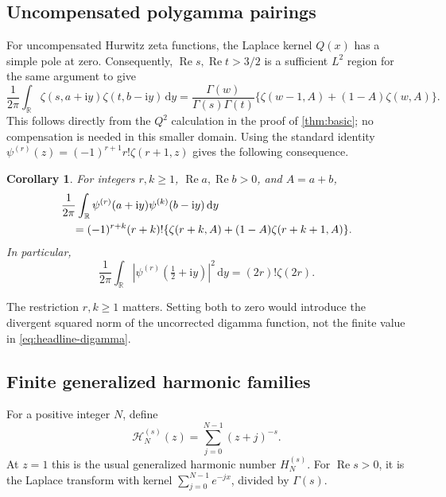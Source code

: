 \documentclass[11pt,a4paper]{article}
\newtheorem{corollary}[theorem]{Corollary}
\theoremstyle{definition}
\numberwithin{equation}{section}
\newcommand{\R}{\mathbb R}
\newcommand{\Rea}{\operatorname{Re}}
\newcommand{\dd}{\,\mathrm d}
\newcommand{\ii}{\mathrm i}
\begin{document}
\subsection{Uncompensated polygamma pairings}
For uncompensated Hurwitz zeta functions, the Laplace kernel $Q(x)$ has a
simple pole at zero. Consequently, $\Rea s,\Rea t>3/2$ is a sufficient
$L^2$ region for the same argument to give
\begin{equation}\label{eq:plain-zeta-pair}
 \frac1{2\pi}\int_{\R}\zeta(s,a+\ii y)\zeta(t,b-\ii y)\dd y
 =\frac{\Gamma(w)}{\Gamma(s)\Gamma(t)}
       \{\zeta(w-1,A)+(1-A)\zeta(w,A)\}.
\end{equation}
This follows directly from the $Q^2$ calculation in the proof of
\cref{thm:basic}; no compensation is needed in this smaller domain.
Using the standard identity
$\psi^{(r)}(z)=(-1)^{r+1}r!\zeta(r+1,z)$ gives the following consequence.

\begin{corollary}\label{thm:polygamma}
For integers $r,k\ge1$, $\Rea a,\Rea b>0$, and $A=a+b$,
\begin{align}
 &\frac1{2\pi}\int_{\R}\psi^{(r)}(a+\ii y)
                                  \psi^{(k)}(b-\ii y)\dd y\notag\\
 &\quad=(-1)^{r+k}(r+k)!
      \{\zeta(r+k,A)+(1-A)\zeta(r+k+1,A)\}.\label{eq:polygamma-pair}
\end{align}
In particular,
\begin{equation}\label{eq:polygamma-norm}
 \frac1{2\pi}\int_{\R}
       |\psi^{(r)}(\tfrac12+\ii y)|^2\dd y=(2r)!\zeta(2r).
\end{equation}
\end{corollary}
The restriction $r,k\ge1$ matters. Setting both to zero would introduce
the divergent squared norm of the uncorrected digamma function, not the
finite value in \eqref{eq:headline-digamma}.

\subsection{Finite generalized harmonic families}
For a positive integer $N$, define
\begin{equation}\label{eq:finite-H}
 \mathcal H_N^{(s)}(z)=\sum_{j=0}^{N-1}(z+j)^{-s}.
\end{equation}
At $z=1$ this is the usual generalized harmonic number $H_N^{(s)}$.
For $\Rea s>0$, it is the Laplace transform with kernel
$\sum_{j=0}^{N-1}e^{-jx}$, divided by $\Gamma(s)$.
\end{document}
